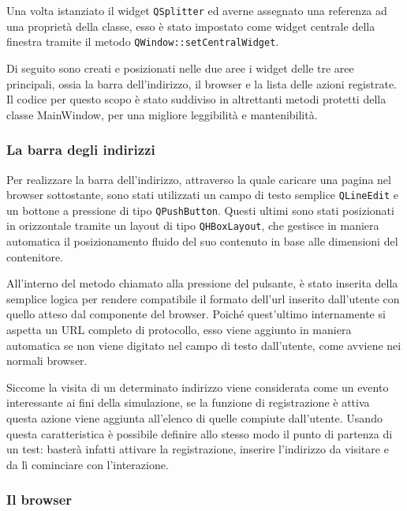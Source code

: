 Una volta istanziato il widget \verb|QSplitter| ed averne assegnato una referenza ad una proprietà della classe, esso è stato impostato come widget centrale della finestra tramite il metodo \verb|QWindow::setCentralWidget|. 



Di seguito sono creati e posizionati nelle due aree i widget delle tre aree principali, ossia la barra dell'indirizzo, il browser e la lista delle azioni registrate. Il codice per questo scopo è stato suddiviso in altrettanti metodi protetti della classe MainWindow, per una migliore leggibilità e mantenibilità. 

\subsubsection{La barra degli indirizzi}

Per realizzare la barra dell'indirizzo, attraverso la quale caricare una pagina nel browser sottostante, sono stati utilizzati un campo di testo semplice \verb|QLineEdit| e un bottone a pressione di tipo \verb|QPushButton|. Questi ultimi sono stati posizionati in orizzontale tramite un layout di tipo \verb|QHBoxLayout|, che gestisce in maniera automatica il posizionamento fluido del suo contenuto in base alle dimensioni del contenitore.

All'interno del metodo chiamato alla pressione del pulsante, è stato inserita della semplice logica per rendere compatibile il formato dell'url inserito dall'utente con quello atteso dal componente del browser. Poiché quest'ultimo internamente si aspetta un URL completo di protocollo, esso viene aggiunto in maniera automatica se non viene digitato nel campo di testo dall'utente, come avviene nei normali browser.

Siccome la visita di un determinato indirizzo viene considerata come un evento interessante ai fini della simulazione, se la funzione di registrazione è attiva questa azione viene aggiunta all'elenco di quelle compiute dall'utente. Usando questa caratteristica è possibile definire allo stesso modo il punto di partenza di un test: basterà infatti attivare la registrazione, inserire l'indirizzo da visitare e da lì cominciare con l'interazione.

\subsubsection{Il browser}


